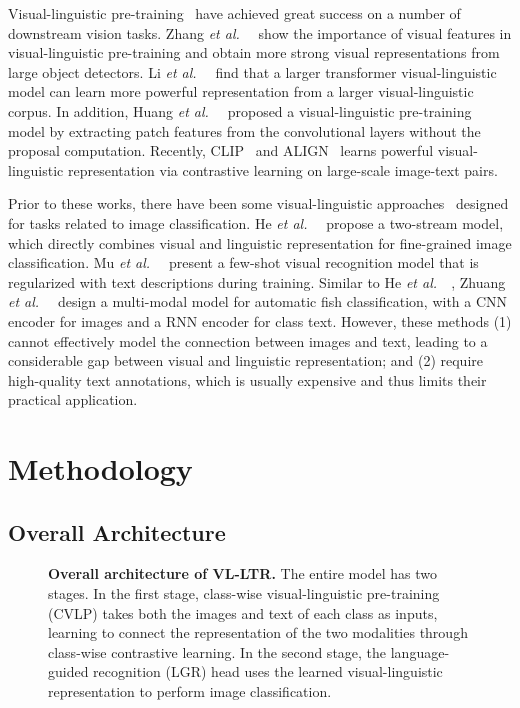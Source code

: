 \documentclass[runningheads]{llncs}
\def\etal{{\em et al.~}}
\begin{document}
Visual-linguistic pre-training~\cite{lu2019vilbert,tan2019lxmert,chen2019uniter,li2020oscar,zhang2021vinvl,li2020closer,gan2020large,li2020hero,lu202012,clip} have achieved great success on a number of downstream vision tasks. 
Zhang \etal~\cite{zhang2021vinvl} show the importance of visual features in visual-linguistic pre-training and obtain more strong visual representations from large object detectors.
Li \etal~\cite{li2020oscar} find that a larger transformer visual-linguistic model can learn more powerful representation from a larger visual-linguistic corpus.
In addition, Huang \etal~\cite{huang2020pixel,su2019vl} proposed a visual-linguistic pre-training model by extracting patch features from the convolutional layers without the proposal computation.
Recently, CLIP~\cite{clip} and ALIGN~\cite{jia2021scaling} learns powerful visual-linguistic representation via contrastive learning on large-scale image-text pairs.


Prior to these works, there have been some visual-linguistic approaches~\cite{he2017fine,zhuang2020wildfish++,mu2019shaping} designed for tasks related to image classification.
He \etal~\cite{he2017fine} propose a two-stream model, which directly combines visual and linguistic representation for fine-grained image classification.
Mu \etal~\cite{mu2019shaping} present a few-shot visual recognition model that is regularized with text descriptions during training.
Similar to He \etal~\cite{he2017fine}, Zhuang \etal~\cite{zhuang2020wildfish++} design a multi-modal model  for automatic fish classification, with a CNN encoder for images and a RNN encoder for class text. However, these methods (1) cannot effectively model the connection between images and text, leading to a considerable gap between visual and linguistic representation; and (2) require high-quality text annotations, which is usually expensive and thus limits their practical application.

\section{Methodology}

\subsection{Overall Architecture}
\label{sec:overall}

\begin{figure*}
		\centering
		\setlength{\fboxrule}{0pt}
\caption{
		\textbf{Overall architecture of VL-LTR.}
		The entire model has two stages.
		In the first stage, class-wise visual-linguistic pre-training (CVLP) takes both the images and text of each class as inputs, learning to connect the representation of the two modalities through class-wise contrastive learning.
		In the second stage, the language-guided recognition (LGR) head uses the learned visual-linguistic representation to perform image classification.
		}
		\label{fig:arch}
\end{figure*}
\end{document}
